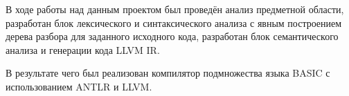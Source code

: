 




В ходе работы над данным проектом был проведён анализ предметной области, разработан блок лексического и синтаксического анализа с явным построением дерева разбора для заданного исходного кода, разработан блок семантического анализа и генерации кода LLVM IR.

В результате чего был реализован компилятор подмножества языка BASIC с использованием ANTLR и LLVM.

